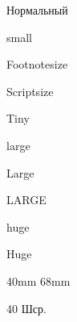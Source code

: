 \documentclass{article}
\begin{document}
	\papergraduate
	
	\normalsize Нормальный
	
	\small small

	\footnotesize Footnotesize
	
	\scriptsize Scriptsize

	\tiny Tiny
	
	\large large
	
	\Large Large
	
	\LARGE LARGE
	
	\huge huge
	
	\Huge Huge
	
	\fontsize
		{40mm}
		{68mm}
	\selectfont
	
	40 Шср.
\end{document}
